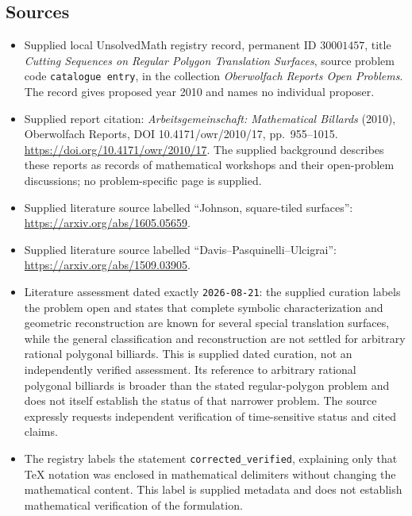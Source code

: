 \documentclass[11pt]{article}
\begin{document}
\subsection{Sources}
\begin{itemize}
\item Supplied local UnsolvedMath registry record, permanent ID \(30001457\), title \emph{Cutting Sequences on Regular Polygon Translation Surfaces}, source problem code \texttt{catalogue entry}, in the collection \emph{Oberwolfach Reports Open Problems}. The record gives proposed year 2010 and names no individual proposer.
\item Supplied report citation: \emph{Arbeitsgemeinschaft: Mathematical Billards} (2010), Oberwolfach Reports, DOI 10.4171/owr/2010/17, pp.\ 955--1015. \url{https://doi.org/10.4171/owr/2010/17}. The supplied background describes these reports as records of mathematical workshops and their open-problem discussions; no problem-specific page is supplied.
\item Supplied literature source labelled ``Johnson, square-tiled surfaces'': \url{https://arxiv.org/abs/1605.05659}.
\item Supplied literature source labelled ``Davis--Pasquinelli--Ulcigrai'': \url{https://arxiv.org/abs/1509.03905}.
\item Literature assessment dated exactly \texttt{2026-08-21}: the supplied curation labels the problem open and states that complete symbolic characterization and geometric reconstruction are known for several special translation surfaces, while the general classification and reconstruction are not settled for arbitrary rational polygonal billiards. This is supplied dated curation, not an independently verified assessment. Its reference to arbitrary rational polygonal billiards is broader than the stated regular-polygon problem and does not itself establish the status of that narrower problem. The source expressly requests independent verification of time-sensitive status and cited claims.
\item The registry labels the statement \texttt{corrected\_verified}, explaining only that TeX notation was enclosed in mathematical delimiters without changing the mathematical content. This label is supplied metadata and does not establish mathematical verification of the formulation.
\end{itemize}
\end{document}
